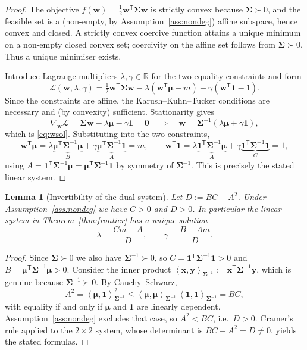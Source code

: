 \documentclass[11pt]{article}
\theoremstyle{definition}
\theoremstyle{plain}
\newtheorem{lemma}[definition]{Lemma}
\newcommand{\R}{\mathbb{R}}
\newcommand{\one}{\mathbf{1}}
\newcommand{\bw}{\bm{w}}
\newcommand{\bmu}{\bm{\mu}}
\newcommand{\bSigma}{\bm{\Sigma}}
\newcommand{\bzero}{\bm{0}}
\newcommand{\T}{^{\mathsf{T}}}
\newcommand{\inner}[2]{\left\langle #1, #2 \right\rangle}
\begin{document}
\begin{proof}
The objective $f(\bw) = \tfrac12 \bw\T \bSigma \bw$ is strictly convex because
$\bSigma \succ 0$, and the feasible set is a (non-empty, by
Assumption~\ref{ass:nondeg}) affine subspace, hence convex and closed.
A strictly convex coercive function attains a unique minimum on a non-empty
closed convex set; coercivity on the affine set follows from $\bSigma \succ 0$.
Thus a unique minimiser exists.

Introduce Lagrange multipliers $\lambda, \gamma \in \R$ for the two equality
constraints and form
\[
\mathcal{L}(\bw, \lambda, \gamma)
= \tfrac12 \bw\T \bSigma \bw
- \lambda(\bw\T \bmu - m)
- \gamma(\bw\T \one - 1).
\]
Since the constraints are affine, the Karush--Kuhn--Tucker conditions are
necessary and (by convexity) sufficient. Stationarity gives
\[
\nabla_{\bw}\mathcal{L} = \bSigma \bw - \lambda \bmu - \gamma \one = \bzero
\quad\Longrightarrow\quad
\bw = \bSigma^{-1}(\lambda \bmu + \gamma \one),
\]
which is \eqref{eq:wsol}. Substituting into the two constraints,
\[
\bw\T \bmu = \lambda \underbrace{\bmu\T\bSigma^{-1}\bmu}_{B}
            + \gamma \underbrace{\bmu\T\bSigma^{-1}\one}_{A} = m,
\qquad
\bw\T \one = \lambda \underbrace{\one\T\bSigma^{-1}\bmu}_{A}
            + \gamma \underbrace{\one\T\bSigma^{-1}\one}_{C} = 1,
\]
using $A = \one\T\bSigma^{-1}\bmu = \bmu\T\bSigma^{-1}\one$ by symmetry of
$\bSigma^{-1}$. This is precisely the stated linear system.
\end{proof}

\begin{lemma}[Invertibility of the dual system]\label{lem:D}
Let $D := BC - A^2$. Under Assumption~\ref{ass:nondeg} we have $C > 0$ and
$D > 0$. In particular the linear system in Theorem~\ref{thm:frontier} has a
unique solution
\[
\lambda = \frac{Cm - A}{D}, \qquad \gamma = \frac{B - Am}{D}.
\]
\end{lemma}

\begin{proof}
Since $\bSigma \succ 0$ we also have $\bSigma^{-1} \succ 0$, so
$C = \one\T \bSigma^{-1}\one > 0$ and $B = \bmu\T\bSigma^{-1}\bmu > 0$.
Consider the inner product $\inner{\bm{x}}{\bm{y}}_{\bSigma^{-1}}
:= \bm{x}\T \bSigma^{-1}\bm{y}$, which is genuine because $\bSigma^{-1}\succ 0$.
By Cauchy--Schwarz,
\[
A^2 = \inner{\bmu}{\one}_{\bSigma^{-1}}^2
\le \inner{\bmu}{\bmu}_{\bSigma^{-1}}\,\inner{\one}{\one}_{\bSigma^{-1}}
= B C,
\]
with equality if and only if $\bmu$ and $\one$ are linearly dependent.
Assumption~\ref{ass:nondeg} excludes that case, so $A^2 < BC$, i.e.\ $D > 0$.
Cramer's rule applied to the $2\times 2$ system, whose determinant is
$BC - A^2 = D \ne 0$, yields the stated formulas.
\end{proof}
\end{document}
